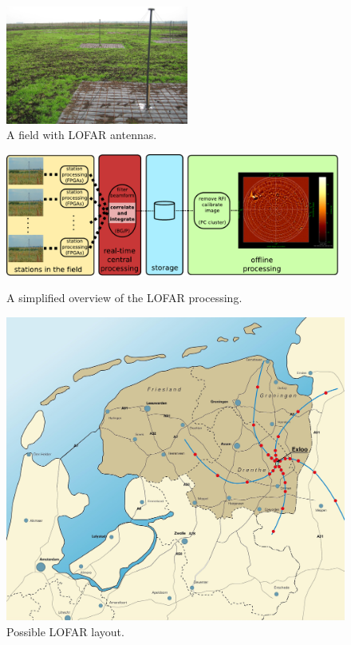 \documentclass{article}
\begin{document}
\begin{figure}[t]
\begin{center}
\includegraphics[width=60mm]{figures/LBA-field.jpg}
\end{center}
\caption{A field with LOFAR antennas.}
\label{fig:lba-field}
\end{figure}

\begin{figure}
\begin{minipage}[b]{11cm}
\includegraphics[width=11cm]{figures/lofar-overview.pdf}
\caption{A simplified overview of the LOFAR processing.}
\label{fig:lofar-overview}
\end{minipage}
\hfill
\begin{minipage}[b]{56mm}
\includegraphics[width=\columnwidth]{figures/map.jpg}
\caption{Possible LOFAR layout.}
\label{fig:map}
\end{minipage}
\end{figure}
\end{document}
